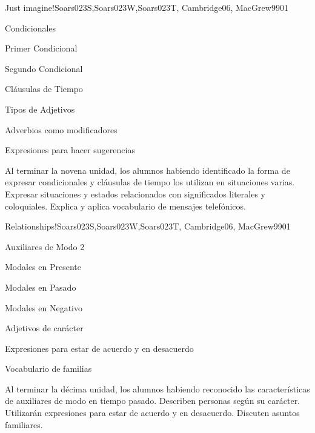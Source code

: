 \begin{syllabus}
\begin{unit}{Just imagine!}{Soars023S,Soars023W,Soars023T, Cambridge06, MacGrew99}{0}{1}
   \begin{topics}
      \item Condicionales
      \item Primer Condicional
      \item Segundo Condicional
      \item Cláusulas de Tiempo
      \item Tipos de Adjetivos
      \item Adverbios como modificadores
      \item Expresiones para hacer sugerencias
   \end{topics}

   \begin{learningoutcomes}
      \item Al terminar la novena unidad, los alumnos habiendo identificado la forma de expresar condicionales y cláusulas de tiempo los utilizan en situaciones varias. Expresar situaciones y estados relacionados con significados literales y coloquiales. Explica y aplica vocabulario de mensajes telefónicos.
   \end{learningoutcomes}

\end{unit}

\begin{unit}{Relationships!}{Soars023S,Soars023W,Soars023T, Cambridge06, MacGrew99}{0}{1}
   \begin{topics}
      \item Auxiliares de Modo 2
      \item Modales en Presente
      \item Modales en Pasado
      \item Modales en Negativo
      \item Adjetivos de carácter
      \item Expresiones para estar de acuerdo y en desacuerdo
      \item Vocabulario de familias
   \end{topics}

   \begin{learningoutcomes}
      \item Al terminar la décima unidad, los alumnos habiendo reconocido las características de auxiliares de modo en tiempo pasado. Describen personas según su carácter. Utilizarán expresiones para estar de acuerdo y en desacuerdo. Discuten asuntos familiares. 
   \end{learningoutcomes}


\end{unit}
\end{syllabus}

